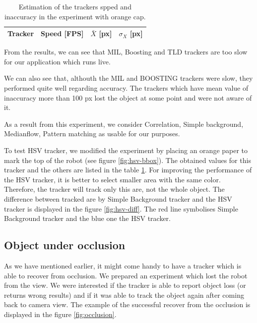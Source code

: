 \begin{table}
\centering
\begin{tabular}{l|r|r|r}
Tracker	& Speed [FPS] & $\bar{X}$ [px] & $\sigma_X$ [px] \\
\hline

\end{tabular}
\caption{Estimation of the trackers spped and inaccuracy in the experiment with orange cap.}
\label{table:hsv}
\end{table}

From the results, we can see that MIL, Boosting and TLD trackers are too slow
for our application which runs live.

We can also see that, althouth the MIL and BOOSTING trackers were slow, they
performed quite well regarding accuracy. The trackers which have mean value of
inaccuracy more than 100 px lost the object at some point and were not aware of
it.

As a result from this experiment, we consider Correlation, Simple background,
Medianflow, Pattern matching as usable for our purposes.

To test HSV tracker, we modified the experiment by placing an orange paper to
mark the top of the robot (see figure \ref{fig:hsv-bbox}). The obtained
values for this tracker and the others are listed in the table \ref{table:hsv}.
For improving the performance of the HSV tracker, it is better to select
smaller area with the same color. Therefore, the tracker will track only this
are, not the whole object. The difference between tracked are by Simple
Background tracker and the HSV tracker is displayed in the figure
\ref{fig:hsv-diff}. The red line symbolises Simple Background tracker and the
blue one the HSV tracker.

\subsection{Object under occlusion}

As we have mentioned earlier, it might come handy to have a tracker which is
able to recover from occlusion. We prepared an experiment which lost the
robot from the view. We were interested if the tracker is able to report object
loss (or returns wrong results) and if it was able to track the object again
after coming back to camera view. The example of the successful recover from
the occlusion is displayed in the figure \ref{fig:occlusion}.



